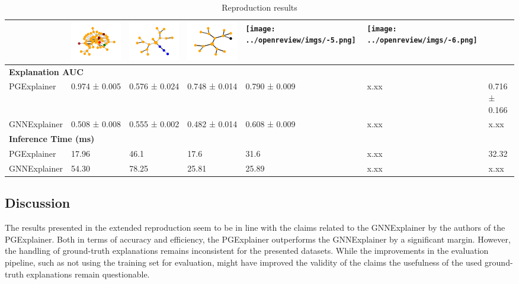\begin{table}[]
\begin{tabular}{lllllll}
& \includegraphics[width=.1\linewidth]{../openreview/imgs/extension/gnn/syn2_bad.png} & \includegraphics[width=.1\linewidth]{../openreview/imgs/extension/gnn/syn3_bad.png} & \multicolumn{1}{l|}{\includegraphics[width=.1\linewidth]{../openreview/imgs/extension/gnn/syn4_bad.png}} & \texttt{[image: ../openreview/imgs/-5.png]} & \texttt{[image: ../openreview/imgs/-6.png]} \\\hline
\multicolumn{7}{l}{\textbf{Explanation AUC}} \\ \hline
PGExplainer & 0.974 ± 0.005 & 0.576 ± 0.024 & 0.748 ± 0.014 & \multicolumn{1}{l|}{0.790 ± 0.009} & x.xx & 0.716 ± 0.166 \\ \hline
GNNExplainer & 0.508 ± 0.008 & 0.555 ± 0.002 & 0.482 ± 0.014 & \multicolumn{1}{l|}{0.608 ± 0.009} & x.xx & x.xx \\ \hline
\multicolumn{7}{l}{\textbf{Inference Time (ms)}} \\ \hline
PGExplainer & 17.96 & 46.1 & 17.6 & \multicolumn{1}{l|}{31.6} & x.xx & 32.32 \\
GNNExplainer & 54.30 & 78.25 & 25.81 & \multicolumn{1}{l|}{25.89} & x.xx & x.xx \\\bottomrule
\end{tabular}
\caption{Reproduction results}
\label{tab:reproduction_results2}
\end{table}


\subsection{Discussion}
The results presented in the extended reproduction seem to be in line with the claims related to the GNNExplainer by the authors of the PGExplainer. Both in terms of accuracy and efficiency, the PGExplainer outperforms the GNNExplainer by a significant margin. However, the handling of ground-truth explanations remains inconsistent for the presented datasets. While the improvements in the evaluation pipeline, such as not using the training set for evaluation, might have improved the validity of the claims the usefulness of the used ground-truth explanations remain questionable. 